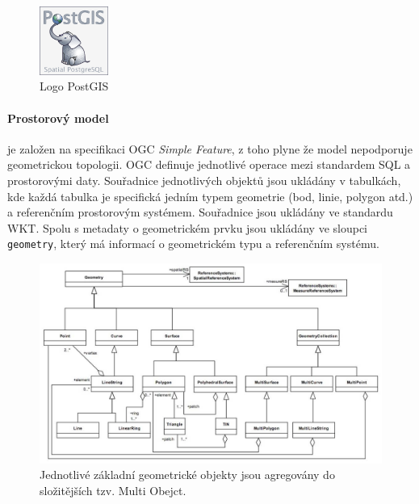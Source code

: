 \documentclass[a4paper,12pt,oneside]{report}
\begin{document}
  
\begin{figure}[h!]
    \centering
    \includegraphics[width=0.2\textwidth]{./img/implementace/postgis.png}
    \caption[Logo PostGIS]{\centering  Logo PostGIS \footnotemark}
 \end{figure}   

\paragraph*{Prostorový model} 
je založen na specifikaci \acs{OGC} \textit{Simple Feature}, z toho plyne že model nepodporuje geometrickou topologii. OGC definuje jednotlivé operace mezi standardem SQL a prostorovými daty. Souřadnice jednotlivých objektů jsou ukládány v tabulkách, kde každá tabulka je specifická jedním typem geometrie (bod, linie, polygon atd.) a referenčním prostorovým systémem. Souřadnice jsou ukládány ve standardu \acs{WKT}. Spolu s  metadaty o geometrickém prvku jsou ukládány ve sloupci \texttt{geometry}, který   má informací o geometrickém typu a referenčním systému.\cite{postgis}

\begin{figure}[h!]
    \centering
    \includegraphics[width=1\textwidth]{./img/implementace/ogc1.jpg}
    \caption[Model PostGIS]{\centering Jednotlivé základní geometrické objekty jsou agregovány do složitějších tzv. Multi Obejct.     \footnotemark}
 \end{figure}   
\end{document}

